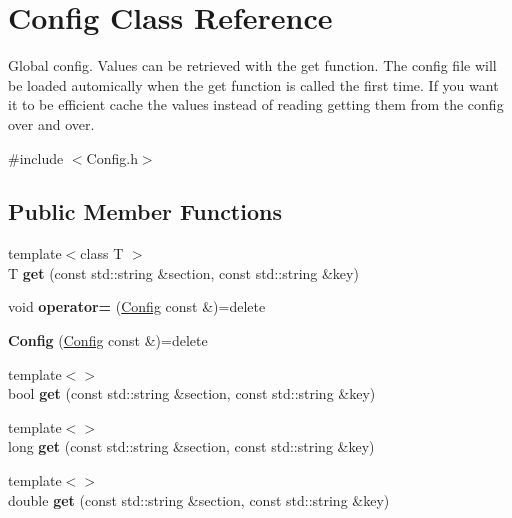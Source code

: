 \hypertarget{classConfig}{}\section{Config Class Reference}
\label{classConfig}


Global config. Values can be retrieved with the get function. The config file will be loaded automically when the get function is called the first time. If you want it to be efficient cache the values instead of reading getting them from the config over and over.  




{\ttfamily \#include $<$Config.\+h$>$}

\subsection*{Public Member Functions}
\begin{DoxyCompactItemize}
\item 
\mbox{\label{classConfig_a7f80dce3d79f5987b9e1e0073ab19795}} 
{\footnotesize template$<$class T $>$ }\\T {\bfseries get} (const std\+::string \&section, const std\+::string \&key)
\item 
\mbox{\label{classConfig_aaef650a441e006c24120aae8e78b6c64}} 
void {\bfseries operator=} (\hyperlink{classConfig}{Config} const \&)=delete
\item 
\mbox{\label{classConfig_ad2e93ef08a872f46ca139ad28d64e2f9}} 
{\bfseries Config} (\hyperlink{classConfig}{Config} const \&)=delete
\item 
\mbox{\label{classConfig_a213d65cd156ab1be0697b96414cd625d}} 
{\footnotesize template$<$$>$ }\\bool {\bfseries get} (const std\+::string \&section, const std\+::string \&key)
\item 
\mbox{\label{classConfig_a53270a0ef7ad1e113c5af3e78579f6d6}} 
{\footnotesize template$<$$>$ }\\long {\bfseries get} (const std\+::string \&section, const std\+::string \&key)
\item 
\mbox{\label{classConfig_a0ae95b2baf456ffb7f7292bc094a3e2a}} 
{\footnotesize template$<$$>$ }\\double {\bfseries get} (const std\+::string \&section, const std\+::string \&key)
\end{DoxyCompactItemize}
